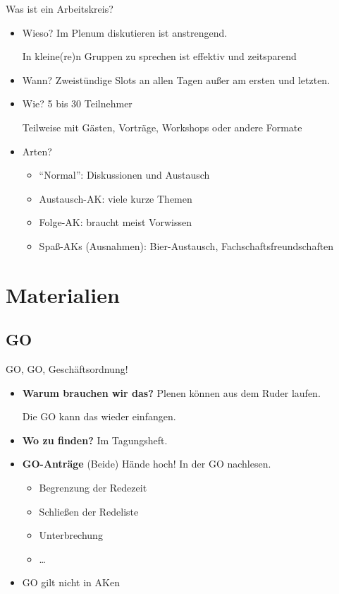 \documentclass[compress,]{beamer}
\begin{document}
\begin{frame}{Was ist ein Arbeitskreis?}

  \begin{itemize}[<+->]
  \item Wieso? Im Plenum diskutieren ist anstrengend.

    In kleine(re)n Gruppen zu sprechen ist effektiv und zeitsparend
  \item Wann? Zweistündige Slots an allen Tagen außer am ersten und letzten.
  \item Wie? 5 bis 30 Teilnehmer

    Teilweise mit Gästen, Vorträge, Workshops oder andere Formate
  \item Arten?
    \begin{itemize}[<+->]
    \item ``Normal'': Diskussionen und Austausch
    \item Austausch-AK: viele kurze Themen
    \item Folge-AK: braucht meist Vorwissen
    \item Spaß-AKs (Ausnahmen): Bier-Austausch, Fachschaftsfreundschaften
    \end{itemize}
  \end{itemize}

\end{frame}


\section{Materialien}

\subsection{GO}

\begin{frame}{GO, GO, Geschäftsordnung!}

  \begin{itemize}[<+->]
  \item<1-> \textbf{Warum brauchen wir das?} Plenen können aus dem Ruder
    laufen.

    Die GO kann das wieder einfangen.
  \item<2-> \textbf{Wo zu finden?} Im Tagungsheft.
  \item<3-> \textbf{GO-Anträge} (Beide) Hände hoch! In der GO nachlesen.

    \begin{itemize}
    \item<5-> Begrenzung der Redezeit
    \item<6-> Schließen der Redeliste
    \item<7-> Unterbrechung
    \item<8-> \ldots
    \end{itemize}
  \item<9-> GO gilt nicht in AKen
  \end{itemize}

\end{frame}
\end{document}
